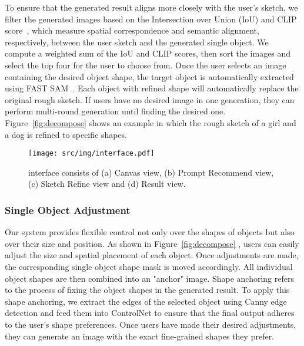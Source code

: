 To ensure that the generated result aligns more closely with the user's sketch, we filter the generated images based on the Intersection over Union (IoU) and CLIP score~\cite{hessel2021clipscore}, which measure spatial correspondence and semantic alignment, respectively, between the user sketch and the generated single object. 
We compute a weighted sum of the IoU and CLIP scores, then sort the images and select the top four for the user to choose from.
Once the user selects an image containing the desired object shape, the target object is automatically extracted using FAST SAM~\cite{zhao2023fast}.
Each object with refined shape will automatically replace the original rough sketch.
If users have no desired image in one generation, they can perform multi-round generation until finding the desired one.
Figure~\ref{fig:decompose} shows an example in which the rough sketch of a girl and a dog is refined to specific shapes.


\begin{figure*}[t]
    \centering
    \texttt{[image: src/img/interface.pdf]}
    \vspace{-3mm}
    \caption{\tool interface consists of (a) Canvas view, (b) Prompt Recommend view, (c) Sketch Refine view and (d) Result view.}
    \label{fig:interface}
    \vspace{-3mm}
\end{figure*}

\subsubsection{Single Object Adjustment}
Our system provides flexible control not only over the shapes of objects but also over their size and position. As shown in Figure~\ref{fig:decompose}
, users can easily adjust the size and spatial placement of each object. 
Once adjustments are made, the corresponding single object shape mask is moved accordingly. 
All individual object shapes are then combined into an "anchor" image.
Shape anchoring refers to the process of fixing the object shapes in the generated result.
To apply this shape anchoring, we extract the edges of the selected object using Canny edge detection and feed them into ControlNet to ensure that the final output adheres to the user's shape preferences. 
Once users have made their desired adjustments, they can generate an image with the exact fine-grained shapes they prefer.


